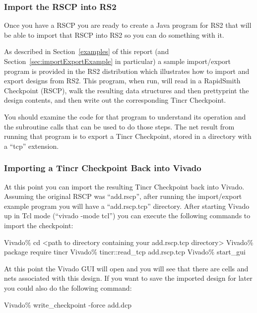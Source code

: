 \subsubsection{Import the RSCP into RS2}
Once you have a RSCP you are ready to create a Java program for RS2 that will be
able to import that RSCP into RS2 so you can do something with it.

As described in Section~\ref{examples} of this report (and
Section~\ref{sec:importExportExample} in particular) a sample import/export program
is provided in the RS2 distribution which illustrates how to import
and export designs from RS2.  This program, when run, will read in a
RapidSmith Checkpoint (RSCP), walk the resulting data structures and
then prettyprint the design contents, and then write out the
corresponding Tincr Checkpoint.   

You should examine the code for that
program to understand its operation and the subroutine calls that can
be used to do those steps.  The net result from running that program
is to export a Tincr Checkpoint, stored in a directory with a ``tcp'' extension.

\subsubsection{Importing a Tincr Checkpoint Back into Vivado}
At this point you can import the resulting Tincr Checkpoint back into Vivado. 
Assuming the original RSCP was ``add.rscp'', after running the import/export
example program  you will have a ``add.rscp.tcp'' directory.  After starting
Vivado up in Tcl mode (``vivado -mode tcl'') you can execute the following
commands to import the checkpoint:

\vspace{-0.15in}  \begin{code}
	Vivado\% cd <path to directory containing your add.rscp.tcp directory>
	Vivado\% package require tincr
	Vivado\% tincr::read_tcp add.rscp.tcp
	Vivado\% start_gui
\end{code}

At this point the Vivado GUI will open and you will see that there are cells and
nets associated with this design.  If you want to save the imported design for
later you could also do the following command:

\vspace{-0.15in}  \begin{code}
	Vivado\% write_checkpoint -force add.dcp
\end{code}

